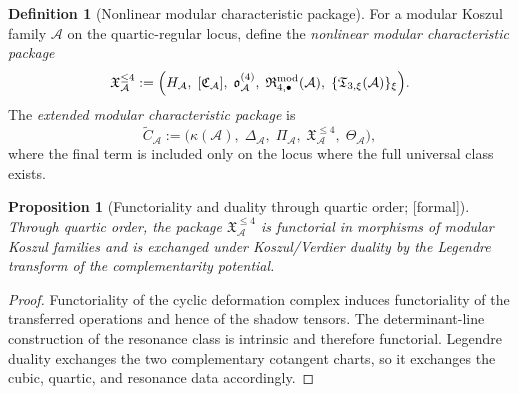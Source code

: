 \documentclass[11pt,oneside]{memoir}
\numberwithin{equation}{chapter}
\newtheorem{proposition}[theorem]{Proposition}
\theoremstyle{definition}
\newtheorem{definition}[theorem]{Definition}
\newcommand{\ClaimStatusProvedHere}{\textnormal{[formal]}}
\newcommand{\cA}{\mathcal A}
\begin{document}
\begin{definition}[Nonlinear modular characteristic package]
\label{def:nms-nonlinear-characteristic-package}
For a modular Koszul family $\cA$ on the quartic-regular locus, define the \emph{nonlinear modular characteristic package}
\[
\mathfrak X_{\cA}^{\le 4}
:=
\Bigl(
H_{\cA},\;
[\mathfrak C_{\cA}],\;
\mathfrak o_{\cA}^{(4)},\;
\mathfrak R_{4,\bullet}^{\mathrm{mod}}(\cA),\;
\{\mathfrak T_{3,\xi}(\cA)\}_\xi
\Bigr).
\]
The \emph{extended modular characteristic package} is
\[
\widetilde C_{\cA}
:=
\bigl(
\kappa(\cA),\;
\Delta_{\cA},\;
\Pi_{\cA},\;
\mathfrak X_{\cA}^{\le 4},\;
\Theta_{\cA}
\bigr),
\]
where the final term is included only on the locus where the full universal class exists.
\end{definition}

\begin{proposition}[Functoriality and duality through quartic order; \ClaimStatusProvedHere]
\label{prop:nms-functoriality-duality-quartic}
Through quartic order, the package $\mathfrak X_{\cA}^{\le 4}$ is functorial in morphisms of modular Koszul families and is exchanged under Koszul/Verdier duality by the Legendre transform of the complementarity potential.
\end{proposition}

\begin{proof}
Functoriality of the cyclic deformation complex induces functoriality of the transferred operations and hence of the shadow tensors.  The determinant-line construction of the resonance class is intrinsic and therefore functorial.  Legendre duality exchanges the two complementary cotangent charts, so it exchanges the cubic, quartic, and resonance data accordingly.\qedhere
\end{proof}
\end{document}
